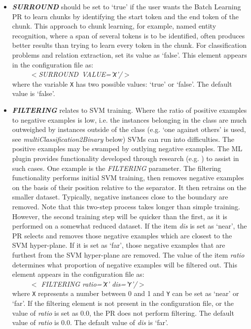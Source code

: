 \begin{itemize}

\item {\em {\bf SURROUND}} should be set to `true' if the user wants the Batch
Learning PR to learn chunks by identifying the start token and the end token of
the chunk. This approach to chunk learning, for example, named entity
recognition, where a span of several tokens is to be identified, often produces
better results than trying to learn every token in the chunk. For classification
problems and relation extraction, set its value as `false'. This element
appears in the
configuration file as:\\
\ \ \ \ \ \mbox{{\em $<$SURROUND VALUE='\texttt{X}'/$>$}}\\
where the variable \texttt{X} has two possible values: `true' or `false'. The
default value is `false'.

\item {\em {\bf FILTERING}} relates to SVM training. Where the ratio of positive
examples to negative examples is low, i.e. the instances belonging in the class
are much outweighed by instances outside of the class (e.g. `one against
others' is used, see {\em multiClassification2Binary} below) SVMs can run into
difficulties. The positive examples may be swamped by outlying negative examples.
The ML plugin provides functionality developed through research (e.g.
\cite{Li08}) to assist in such cases. One example is the {\em FILTERING}
parameter. The filtering functionality performs initial SVM training, then removes negative
examples on the basis of their position relative to the separator. It then
retrains on the smaller dataset. Typically, negative instances close to the
boundary are removed. Note that this two-step process takes longer than simple
training. However, the second training step will be quicker than the first, as it
is performed on a somewhat reduced dataset. If the item {\em dis} is set as
`near', the PR selects and removes those negative examples which are
closest to the SVM hyper-plane. If it is set as `far', those negative examples
that are furthest from the SVM hyper-plane are removed. The value of the item
{\em ratio} determines what proportion of negative examples will be filtered out.
This element appears in the
configuration file as:\\
\ \ \ \ \  {\em $<$ FILTERING ratio='\texttt{X}' dis='\texttt{Y}'/$>$}\\
 where
\texttt{X} represents a number between 0 and 1 and  \texttt{Y} can be set as
`near' or `far'. If the filtering element is not present in the configuration
file, or the value of {\em ratio} is set as $0.0$, the PR does not perform
filtering. The default value of {\em ratio} is $0.0$. The default value of {\em
dis} is `far'.


\end{itemize}
